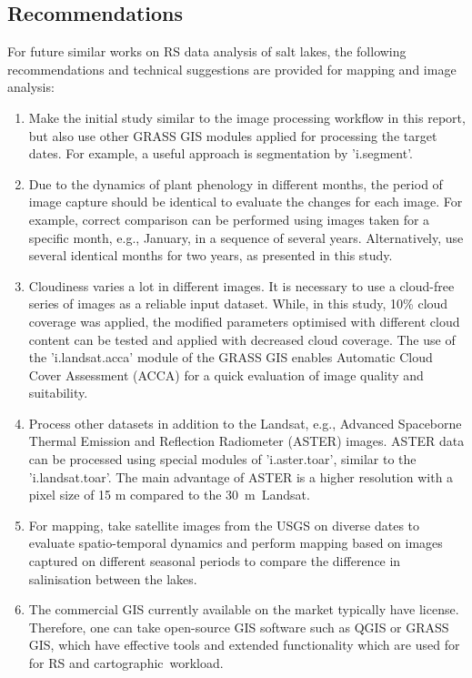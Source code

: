 \documentclass[land,article,accept,pdftex,moreauthors]{Definitions/mdpi}
\begin{document}
\subsection{Recommendations}

For future similar works on RS data analysis of salt lakes, {the} following recommendations and technical suggestions {are provided }for mapping and image analysis:

\begin{enumerate}
	\item Make the initial study similar to the image processing workflow in this report, but also use other GRASS GIS modules applied for processing the target dates. For example, a useful approach is segmentation by 'i.segment'.
	\item Due to the dynamics of plant phenology in different months, the period of image capture should be identical to evaluate the changes for each image. For example, {correct} comparison can be performed using images taken for a specific month{, e.g.,} January, in a sequence of several years{. Alternatively, use} several identical months for two years, as presented in this study.
	\item Cloudiness varies a lot in different images. It is necessary to use a cloud-free series of images as{ a reliable input} dataset. While, in this study, 10\% cloud coverage was applied, the modified parameters optimised with different cloud content can be tested and applied with decreased cloud coverage. The use of the 'i.landsat.acca' module of the {GRASS} GIS enables Automatic Cloud Cover Assessment (ACCA) for a quick evaluation of image quality and suitability.
	\item Process other datasets in addition to the Landsat, e.g., Advanced Spaceborne Thermal Emission and Reflection Radiometer (ASTER) images. ASTER data can be {processed} using special modules of 'i.aster.toar', similar to the 'i.landsat.toar'. The main advantage of ASTER is a higher resolution {with }a pixel size of 15 m compared to the \mbox{30 m Landsat. }
	\item For mapping, take satellite images from the USGS on diverse dates to evaluate spatio-temporal dynamics and perform mapping {based }on images captured on different seasonal periods to compare the difference in salinisation between the lakes.
	\item The commercial GIS currently available on the market typically have license. Therefore, one can take open-source GIS software such as QGIS or GRASS GIS, which have effective tools and extended functionality which are used for for RS and cartographic~workload.

\end{enumerate}
\end{document}
